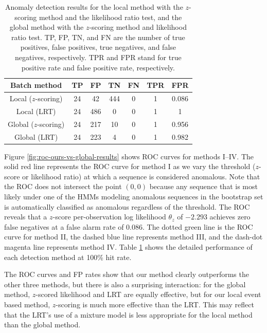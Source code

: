 \begin{table}[t]
  \caption[Anomaly detection results for the local method with the
    $z$-scoring method and the likelihood ratio test, and the global
    method with the $z$-scoring method and likelihood ratio
    test.]{\small Anomaly detection results for the local method with
    the $z$-scoring method and the likelihood ratio test, and the
    global method with the $z$-scoring method and likelihood ratio
    test. TP, FP, TN, and FN are the number of true positives, 
    false positives, true negatives, and false negatives, respectively. 
    TPR and FPR stand for true positive rate and false positive rate, 
    respectively.}
  \begin{center}
    \begin{tabular}{c|c|c|c|c|c|c}
      \hline Batch method & TP & FP & TN & FN & TPR & FPR \\ \hline \hline
      Local ($z$-scoring) & 24 & 42 & 444 & 0 & 1 & 0.086 \\ \hline
      Local (LRT) & 24 & 486 & 0 & 0 & 1 & 1 \\ \hline 
      Global ($z$-scoring) & 24 & 217 & 10 & 0 & 1 & 0.956 \\ \hline 
      Global (LRT) & 24 & 223 & 4 & 0 & 1 & 0.982 \\ \hline
    \end{tabular}
  \end{center}
  \label{tab:hmm-based-detection-results}
\end{table} 

Figure \ref{fig:roc-ours-vs-global-results} shows ROC curves for
methods I--IV.  The solid red line represents the ROC curve for method
I as we vary the threshold ($z$-score or likelihood ratio) at which a
sequence is considered anomalous. Note that the ROC does not intersect
the point $(0, 0)$ because any sequence that is most likely under one
of the HMMs modeling anomalous sequences in the bootstrap set is
automatically classified as anomalous regardless of the threshold. The
ROC reveals that a $z$-score per-observation log likelihood $\theta_z$
of $-2.293$ achieves zero false negatives at a false alarm rate of
0.086. The dotted green line is the ROC curve for method II, the
dashed blue line represents method III, and the dash-dot magenta line
represents method IV.  Table
\ref{tab:hmm-based-detection-results} shows the detailed performance
of each detection method at 100\% hit rate.

The ROC curves and FP rates show that our method clearly outperforms
the other three methods, but there is also a surprising interaction:
for the global method, $z$-scored likelihood and LRT are equally
effective, but for our local event based method, $z$-scoring is much
more effective than the LRT.  This may reflect that the LRT's use of a
mixture model is less appropriate for the local method than the global
method.

